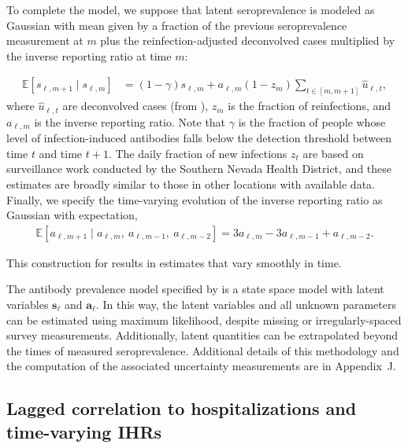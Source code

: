 \begin{linenomath*}
To complete the model, we suppose that latent seroprevalence is modeled as 
Gaussian with mean given by a fraction of the previous seroprevalence
measurement at $m$ plus the reinfection-adjusted deconvolved cases multiplied by
the inverse reporting ratio at time $m$:
\end{linenomath*}
\begin{linenomath*}
\begin{align}
  \label{eq:expect-sero}
\mathbb{E}[s_{\ell,m+1} \mid s_{\ell,m}] & = (1 -\gamma) s_{\ell,m} 
+ a_{\ell,m} (1 - z_{m}) \sum_{t\in[m,m+1]}\widehat{u}_{\ell,t},
\end{align}
where $\widehat{u}_{\ell,t}$ are deconvolved cases (from
), $z_{m}$ is the fraction of reinfections, and
$a_{\ell,m}$ is the inverse reporting ratio. Note that $\gamma$ is the fraction
of people whose level of infection-induced antibodies falls below the detection
threshold between time $t$ and time $t+1$. The daily fraction of new infections
$z_t$ are based on surveillance work conducted by the Southern Nevada Health
District, \citep{ruff2022rapid} and these estimates are broadly similar to those
in other locations with available data. \citep{ruff2022rapid, nyreinfect2021,
hireinfect2022, wareinfect2022} Finally, we specify the time-varying evolution
of the inverse reporting ratio as Gaussian with expectation,
\begin{align}
  \label{eq:report-ratio}
\mathbb{E}[a_{\ell,m+1} \mid a_{\ell,m},\ a_{\ell,m-1},\ a_{\ell,m-2}] = 3a_{\ell,m} - 3a_{\ell,m-1} + a_{\ell,m-2}.
\end{align}
\end{linenomath*}
This construction for  results in estimates that vary
smoothly in time.

    
The antibody prevalence model specified by
 is a state space model with
latent variables $\mathbf{s}_{\ell}$ and $\mathbf{a}_{\ell}$. In this way, 
the latent variables and all unknown parameters can be estimated using maximum likelihood, despite
missing or irregularly-spaced survey
measurements. Additionally, latent quantities can be extrapolated beyond the
times of measured seroprevalence. Additional details of
this methodology and the computation of the associated uncertainty measurements
are in Appendix~J.



\subsection{Lagged correlation to hospitalizations and time-varying IHRs} 
\label{sec:ihr-calculations}

